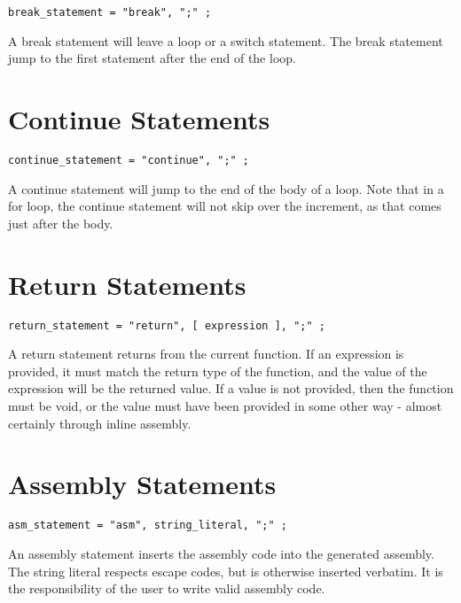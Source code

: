 \documentclass[letterpaper,12pt]{book}
\begin{document}
\begin{lstlisting}[breaklines=true]
break_statement = "break", ";" ;
\end{lstlisting}

A break statement will leave a loop or a switch statement. The break statement jump to the first statement after the end of the loop.

\section{Continue Statements}

\begin{lstlisting}[breaklines=true]
continue_statement = "continue", ";" ;
\end{lstlisting}

A continue statement will jump to the end of the body of a loop. Note that in a for loop, the continue statement will not skip over the increment, as that comes just after the body.

\section{Return Statements}

\begin{lstlisting}[breaklines=true]
return_statement = "return", [ expression ], ";" ;
\end{lstlisting}

A return statement returns from the current function. If an expression is provided, it must match the return type of the function, and the value of the expression will be the returned value. If a value is not provided, then the function must be void, or the value must have been provided in some other way - almost certainly through inline assembly.

\section{Assembly Statements}

\begin{lstlisting}[breaklines=true]
asm_statement = "asm", string_literal, ";" ;
\end{lstlisting}

An assembly statement inserts the assembly code into the generated assembly. The string literal respects escape codes, but is otherwise inserted verbatim. It is the responsibility of the user to write valid assembly code.
\end{document}

